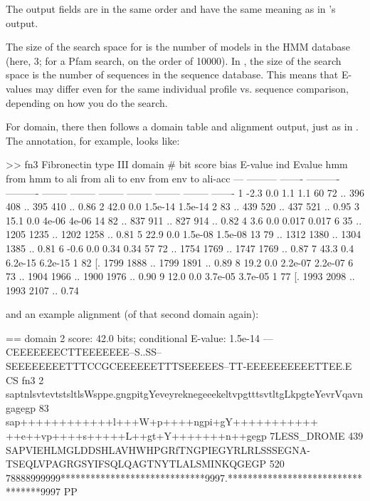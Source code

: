 The output fields are in the same order and have the same meaning as
in 's output. 

The size of the search space for  is the number of
models in the HMM database (here, 3; for a Pfam search, on the order
of 10000). In , the size of the search space is the
number of sequences in the sequence database. This means that E-values
may differ even for the same individual profile vs. sequence
comparison, depending on how you do the search.

For domain, there then follows a domain table and alignment output,
just as in . The  annotation, for example,
looks like:

\begin{sreoutput}
>> fn3  Fibronectin type III domain
     # bit score    bias    E-value ind Evalue hmm from   hmm to    ali from   ali to    env from   env to    ali-acc
   --- --------- ------- ---------- ---------- -------- --------    -------- --------    -------- --------    -------
     1      -2.3     0.0        1.1        1.1       60       72 ..      396      408 ..      395      410 ..    0.86
     2      42.0     0.0    1.5e-14    1.5e-14        2       83 ..      439      520 ..      437      521 ..    0.95
     3      15.1     0.0      4e-06      4e-06       14       82 ..      837      911 ..      827      914 ..    0.82
     4       3.6     0.0      0.017      0.017        6       35 ..     1205     1235 ..     1202     1258 ..    0.81
     5      22.9     0.0    1.5e-08    1.5e-08       13       79 ..     1312     1380 ..     1304     1385 ..    0.81
     6      -0.6     0.0       0.34       0.34       57       72 ..     1754     1769 ..     1747     1769 ..    0.87
     7      43.3     0.4    6.2e-15    6.2e-15        1       82 [.     1799     1888 ..     1799     1891 ..    0.89
     8      19.2     0.0    2.2e-07    2.2e-07        6       73 ..     1904     1966 ..     1900     1976 ..    0.90
     9      12.0     0.0    3.7e-05    3.7e-05        1       77 [.     1993     2098 ..     1993     2107 ..    0.74
\end{sreoutput}

and an example alignment (of that second domain again):

\begin{sreoutput}
  == domain 2    score: 42.0 bits;  conditional E-value: 1.5e-14
                  ---CEEEEEEECTTEEEEEEE--S..SS--SEEEEEEEETTTCCGCEEEEEETTTSEEEEES--TT-EEEEEEEEEETTEE.E CS
          fn3   2 saptnlsvtevtstsltlsWsppe.gngpitgYeveyreknegeeekeltvpgtttsvtltgLkpgteYevrVqavngagegp 83
                  sap++++++++++++l+++W+p++++ngpi+gY+++++++++++ ++e++vp++++s+++++L++gt+Y+++++++n++gegp
  7LESS_DROME 439 SAPVIEHLMGLDDSHLAVHWHPGRfTNGPIEGYRLRLSSSEGNA-TSEQLVPAGRGSYIFSQLQAGTNYTLALSMINKQGEGP 520
                  78888999999*****************************9997.**********************************9997 PP
\end{sreoutput}

